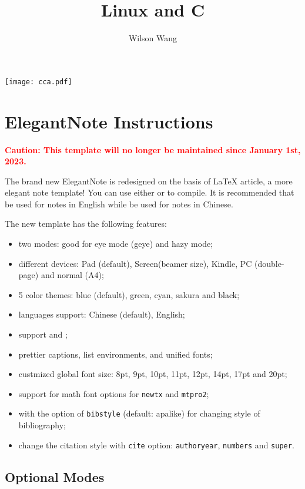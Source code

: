 \documentclass[en,hazy,blue,screen,14pt]{elegantnote}
\title{Linux and C}
\author{Wilson Wang}
\institute{Cherry Creek Academy}
\begin{document}
\maketitle
\centerline{\texttt{[image: cca.pdf]}}

\newpage
\section{ElegantNote Instructions}
\thispagestyle{empty}
\textcolor{red}{\bfseries Caution: This template will no longer be maintained since January 1st, 2023.}


The brand new ElegantNote is redesigned on the basis of \LaTeX{} article, a more elegant note template! You can use either  or  to compile. It is recommended that  be used for notes in English while  be used for notes in Chinese.


The new template has the following features:
\begin{itemize}
  \item two modes: good for eye mode (geye) and hazy mode;
  \item different devices: Pad (default), Screen(beamer size), Kindle, PC (double-page) and normal (A4);
  \item 5 color themes: \textcolor{eblue}{blue} (default),  \textcolor{egreen}{green}, \textcolor{ecyan}{cyan}, \textcolor{sakura}{sakura} and \textcolor{black}{black};
  \item languages support: Chinese (default), English;
  \item support  and ;
  \item prettier captions, list environments, and unified fonts;
  \item custmized global font size: 8pt, 9pt, 10pt, 11pt, 12pt, 14pt, 17pt and 20pt;
  \item support for math font options for \lstinline{newtx} and \lstinline{mtpro2};
  \item with the option of \lstinline{bibstyle} (default: apalike) for changing style of bibliography;
  \item change the citation style with \lstinline{cite} option: \lstinline{authoryear}, \lstinline{numbers} and \lstinline{super}.
\end{itemize}

\subsection{Optional Modes}
\end{document}
